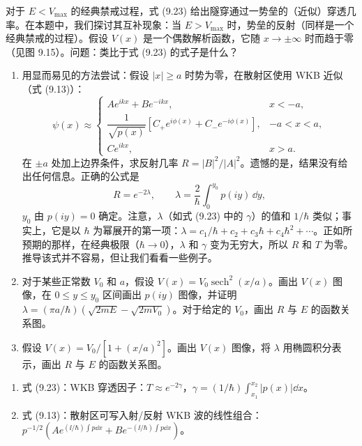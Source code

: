 \begin{question}
对于 $E<V_{\max}$ 的经典禁戒过程，式 (9.23) 给出隧穿通过一势垒的（近似）穿透几率。在本题中，我们探讨其互补现象：当 $E>V_{\max}$ 时，势垒的反射（同样是一个经典禁戒的过程）。假设 $V(x)$ 是一个偶数解析函数，它随 $x\to\pm\infty$ 时而趋于零（见图 9.15）。问题：类比于式 (9.23) 的式子是什么？
\begin{enumerate}
\item 用显而易见的方法尝试：假设 $|x|\ge a$ 时势为零，在散射区使用 WKB 近似（式 (9.13)）：
\[
\psi(x)\approx\begin{cases}
Ae^{ikx}+Be^{-ikx}, & x<-a,\\
\dfrac{1}{\sqrt{p(x)}}\left[C_+e^{i\phi(x)}+C_-e^{-i\phi(x)}\right], & -a<x<a,\\
Ce^{ikx}, & x>a.
\end{cases}
\]
在 $\pm a$ 处加上边界条件，求反射几率 $R=|B|^2/|A|^2$。遗憾的是，结果没有给出任何信息。正确的公式是
\[
R=e^{-2\lambda},\qquad \lambda=\frac{2}{\hbar}\int_0^{y_0}p(iy)\,\dd y,
\]
$y_0$ 由 $p(iy)=0$ 确定。注意，$\lambda$（如式 (9.23) 中的 $\gamma$）的值和 $1/\hbar$ 类似；事实上，它是以 $\hbar$ 为幂展开的第一项：$\lambda=c_1/\hbar+c_2+c_3\hbar+c_4\hbar^2+\cdots$。正如所预期的那样，在经典极限（$\hbar\to0$），$\lambda$ 和 $\gamma$ 变为无穷大，所以 $R$ 和 $T$ 为零。推导该式并不容易，但让我们看看一些例子。
\item 对于某些正常数 $V_0$ 和 $a$，假设 $V(x)=V_0\operatorname{sech}^2(x/a)$。画出 $V(x)$ 图像，在 $0\le y\le y_0$ 区间画出 $p(iy)$ 图像，并证明 $\lambda=(\pi a/\hbar)(\sqrt{2mE}-\sqrt{2mV_0})$。对于给定的 $V_0$，画出 $R$ 与 $E$ 的函数关系图。
\item 假设 $V(x)=V_0/[1+(x/a)^2]$。画出 $V(x)$ 图像，将 $\lambda$ 用椭圆积分表示，画出 $R$ 与 $E$ 的函数关系图。
\end{enumerate}

\par\smallskip
{}
\begin{enumerate}[leftmargin=2.2em,itemsep=0.12em,topsep=0.12em,parsep=0pt]
\item 式 (9.23)：WKB 穿透因子：$T\approx e^{-2\gamma}$，$\gamma=(1/\hbar)\int_{x_1}^{x_2}|p(x)|\dd x$。
\item 式 (9.13)：散射区可写入射/反射 WKB 波的线性组合：$p^{-1/2}(Ae^{(\ii/\hbar)\int p\dd x}+Be^{-(\ii/\hbar)\int p\dd x})$。
\end{enumerate}

\end{question}
